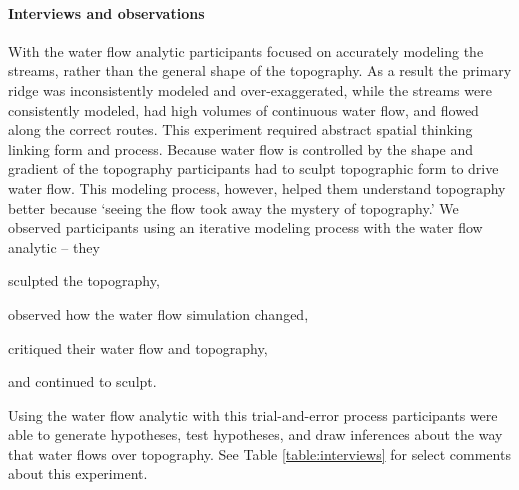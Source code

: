 \documentclass[prodmode,acmtochi]{acmsmall} %
\begin{document}
\paragraph{Interviews and observations}
With the water flow analytic
participants focused on accurately modeling the streams, 
rather than the general shape of the topography. 
As a result the primary ridge was 
inconsistently modeled and over-exaggerated,
while the streams were consistently modeled,
had high volumes of continuous water flow, 
and flowed along the correct routes.
This experiment required abstract spatial thinking linking form and process. 
Because water flow is controlled by the shape and gradient of the topography
participants had to sculpt topographic form to drive water flow. 
This modeling process, however, helped them understand topography better 
because `seeing the flow took away the mystery of topography.'
%
We observed participants using an iterative modeling process 
with the water flow analytic -- 
they 
\begin{enumerate*}[label=\alph*),font=\itshape]
\item sculpted the topography, 
\item observed how the water flow simulation changed, 
\item critiqued their water flow and topography, 
\item and continued to sculpt.
\end{enumerate*}
%
Using the water flow analytic with this trial-and-error process
participants were able to generate hypotheses, test hypotheses, and draw inferences 
about the way that water flows over topography. 
See Table \ref{table:interviews} for select comments about this experiment.
%

\end{document}

